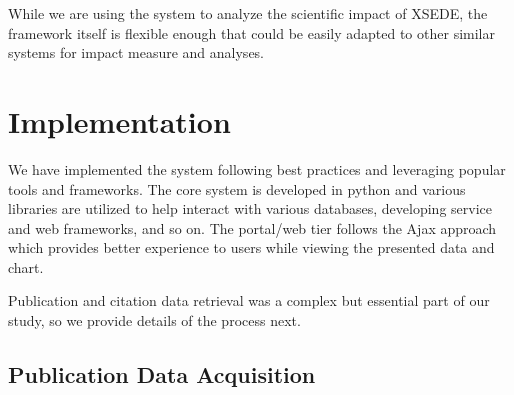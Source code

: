 \documentclass{sig-alternate}
\begin{document}
While we are using the system to analyze the scientific impact of XSEDE, the framework itself is flexible enough that could be easily adapted to other similar systems for impact measure and analyses. 
 
\section{Implementation} \label{S:implementation}
 
We have implemented the system following best practices and leveraging popular tools and frameworks. The core system is developed in python and various libraries are utilized to help interact with various databases, developing service and web frameworks, and so on. The portal/web tier follows the Ajax approach which provides better experience to users while viewing the presented data and chart. 

Publication and citation data retrieval was a complex but essential part of our study, so we provide details of the process next. 
  
\subsection{Publication Data Acquisition} 
 
\end{document}
